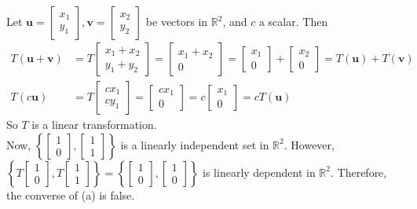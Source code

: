 Let $\textbf{u} = \begin{bmatrix}
	x_1 \\ y_1
\end{bmatrix}, \textbf{v} = \begin{bmatrix}
	x_2 \\ y_2
\end{bmatrix}$ be vectors in $\mathbb{R}^2$, and $c$ a scalar. Then \begin{align*}
	T(\textbf{u} + \textbf{v}) &= T\begin{bmatrix}
		x_1 + x_2 \\ y_1 + y_2
	\end{bmatrix} = \begin{bmatrix}
		x_1 + x_2 \\ 0
	\end{bmatrix} = \begin{bmatrix}
		x_1 \\ 0
	\end{bmatrix} + \begin{bmatrix}
		x_2 \\ 0
	\end{bmatrix} = T(\textbf{u}) + T(\textbf{v}) \\
	T(c\textbf{u}) &= T\begin{bmatrix}
		cx_1 \\ cy_1
	\end{bmatrix} = \begin{bmatrix}
		cx_1 \\ 0
	\end{bmatrix} = c\begin{bmatrix}
		x_1 \\ 0
	\end{bmatrix} = cT(\textbf{u})
\end{align*} So $T$ is a linear transformation. \\

Now, $\left\{ \begin{bmatrix}
	1 \\ 0
\end{bmatrix}, \begin{bmatrix}
	1 \\ 1
\end{bmatrix} \right\}$ is a linearly independent set in $\mathbb{R}^2$. However, $\left\{ T\begin{bmatrix}
	1 \\ 0
\end{bmatrix}, T\begin{bmatrix}
	1 \\ 1
\end{bmatrix} \right\} = \left\{\begin{bmatrix}
	1 \\ 0
\end{bmatrix}, \begin{bmatrix}
	1 \\ 0
\end{bmatrix}\right\}$ is linearly dependent in $\mathbb{R}^2$. Therefore, the converse of (a) is false. \\

